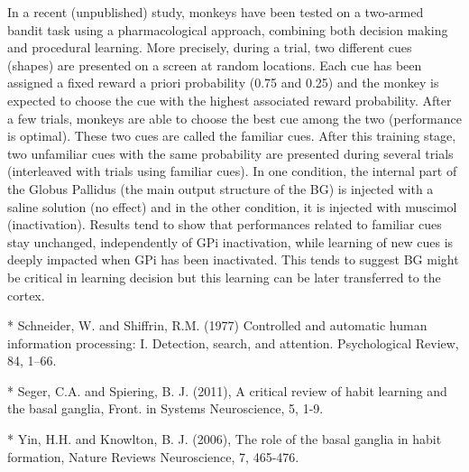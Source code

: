 In a recent (unpublished) study, monkeys have been tested on a two-armed bandit
task using a pharmacological approach, combining both decision making and
procedural learning. More precisely, during a trial, two different cues
(shapes) are presented on a screen at random locations. Each cue has been
assigned a fixed reward a priori probability (0.75 and 0.25) and the monkey is
expected to choose the cue with the highest associated reward probability.
After a few trials, monkeys are able to choose the best cue among the two
(performance is optimal). These two cues are called the familiar cues. After
this training stage, two unfamiliar cues with the same probability are
presented during several trials (interleaved with trials using familiar
cues). In one condition, the internal part of the Globus Pallidus (the main
output structure of the BG) is injected with a saline solution (no effect) and
in the other condition, it is injected with muscimol (inactivation). Results
tend to show that performances related to familiar cues stay unchanged,
independently of GPi inactivation, while learning of new cues is deeply
impacted when GPi has been inactivated. This tends to suggest BG might be
critical in learning decision but this learning can be later transferred to the
cortex.


* Schneider, W. and Shiffrin, R.M. (1977) Controlled and automatic human
  information processing: I. Detection, search, and attention. Psychological
  Review, 84, 1–66.

* Seger, C.A. and Spiering, B. J. (2011), A critical review of habit learning
  and the basal ganglia, Front. in Systems Neuroscience, 5, 1-9.

* Yin, H.H. and Knowlton, B. J. (2006), The role of the basal ganglia in habit
  formation, Nature Reviews Neuroscience, 7, 465-476.




